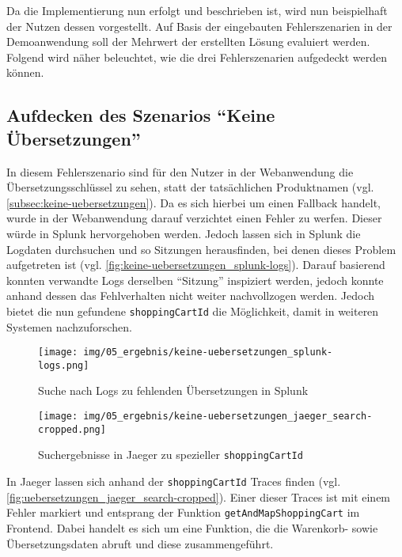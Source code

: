 
Da die Implementierung nun erfolgt und beschrieben ist, wird nun beispielhaft der Nutzen dessen vorgestellt. Auf Basis der eingebauten Fehlerszenarien in der Demoanwendung soll der Mehrwert der erstellten Lösung evaluiert werden. Folgend wird näher beleuchtet, wie die drei Fehlerszenarien aufgedeckt werden können.

\subsection{Aufdecken des Szenarios \enquote{Keine Übersetzungen}}

In diesem Fehlerszenario sind für den Nutzer in der Webanwendung die Übersetzungsschlüssel zu sehen, statt der tatsächlichen Produktnamen (vgl. \autoref{subsec:keine-uebersetzungen}). Da es sich hierbei um einen Fallback handelt, wurde in der Webanwendung darauf verzichtet einen Fehler zu werfen. Dieser würde in Splunk hervorgehoben werden. Jedoch lassen sich in Splunk die Logdaten durchsuchen und so Sitzungen herausfinden, bei denen dieses Problem aufgetreten ist (vgl. \autoref{fig:keine-uebersetzungen_splunk-logs}). Darauf basierend konnten verwandte Logs derselben \enquote{Sitzung} inspiziert werden, jedoch konnte anhand dessen das Fehlverhalten nicht weiter nachvollzogen werden. Jedoch bietet die nun gefundene \texttt{shoppingCartId} die Möglichkeit, damit in weiteren Systemen nachzuforschen.
	
\begin{figure}[H]
	\centering
	\texttt{[image: img/05\_ergebnis/keine-uebersetzungen\_splunk-logs.png]}
	\caption{Suche nach Logs zu fehlenden Übersetzungen in Splunk}
	\label{fig:keine-uebersetzungen_splunk-logs}
\end{figure}

\begin{wrapfigure}[13]{r}{0.50\textwidth}
\centering
\texttt{[image: img/05\_ergebnis/keine-uebersetzungen\_jaeger\_search-cropped.png]}
\caption{Suchergebnisse in Jaeger zu spezieller \texttt{shoppingCartId}}
\label{fig:uebersetzungen_jaeger_search-cropped}
\end{wrapfigure}

In Jaeger lassen sich anhand der \texttt{shopping\-Cart\-Id} Traces finden (vgl. \autoref{fig:uebersetzungen_jaeger_search-cropped}). Einer dieser Traces ist mit einem Fehler markiert und entsprang der Funktion \texttt{getAndMapShoppingCart} im Frontend. Dabei handelt es sich um eine Funktion, die die Warenkorb- sowie Übersetzungsdaten abruft und diese zusammengeführt.

